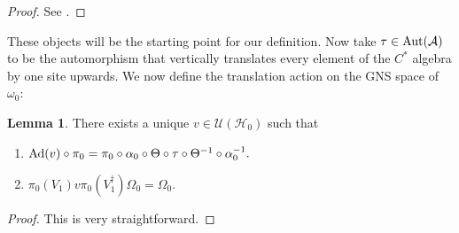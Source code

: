 \documentclass[12pt,a4paper,twoside]{article}
\let\originalleft\left
\let\originalright\right
\renewcommand{\left}{\mathopen{}\mathclose\bgroup\originalleft}
\renewcommand{\right}{\aftergroup\egroup\originalright}
\newcommand{\UU}{\mathcal U}
\newcommand{\HH}{\mathcal H}
\renewcommand{\AA}{\mathcal A}
\newcommand{\Ad}[1]{\textrm{Ad}\left(#1\right)}
\newcommand{\Aut}[1]{\textrm{Aut}\left(#1\right)}
\theoremstyle{definition}
\newtheorem{lemma}[theorem]{Lemma}
\numberwithin{equation}{section}
\begin{document}
\begin{proof}
	See \cite{ogata2021h3gmathbb}.
\end{proof}
These objects will be the starting point for our definition. Now take $\tau\in\Aut{\AA}$ to be the automorphism that vertically translates every element of the $C^*$ algebra by one site upwards. We now define the translation action on the GNS space of $\omega_0$:
\begin{lemma}
	There exists a unique $v\in\UU(\HH_0)$ such that
	\begin{enumerate}
		\item $\Ad{v}\circ\pi_0=\pi_0\circ\alpha_0\circ\Theta\circ\tau\circ\Theta^{-1}\circ\alpha_0^{-1}.$
		\item $\pi_0(V_1)v\pi_0(V_1^\dagger)\Omega_0=\Omega_0.$
	\end{enumerate}
\end{lemma}
\begin{proof}
	This is very straightforward.
\end{proof}
\end{document}
